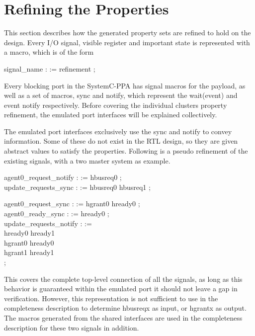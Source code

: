 \section{Refining the Properties}
\label{sec:refine}
This section describes how the generated property sets are refined to hold on the design. Every I/O signal, visible register and important state is represented with a macro, which is of the form \par  
{} signal\_name :  := refinement ; \par
Every blocking port in the SystemC-PPA has signal macros for the payload, as well as a set of macros, sync and notify, which represent the wait(event) and event notify respectively. Before covering the individual clusters property refinement, the emulated port interfaces will be explained collectively. \par
The emulated port interfaces exclusively use the sync and notify to convey information. Some of these do not exist in the RTL design, so they are given abstract values to satisfy the properties. Following is a pseudo refinement of the existing signals, with a two master system as example. \par
{} agent0\_request\_notify :  := hbusreq0 ; \\
 update\_requests\_sync :  := hbusreq0  hbusreq1 ; \par
{} agent0\_request\_sync :  := hgrant0  hready0 ; \\
 agent0\_ready\_sync :  := hready0 ; \\
 update\_requests\_notify :  := \\ hready0  hready1  \\ hgrant0  hready0  \\ hgrant1  hready1 \\ ; \par
This covers the complete top-level connection of all the signals, as long as this behavior is guaranteed within the emulated port it should not leave a gap in verification. However, this representation is not sufficient to use in the completeness description to determine hbusreqx as input, or hgrantx as output. The macros generated from the shared interfaces are used in the completeness description for these two signals in addition. 

